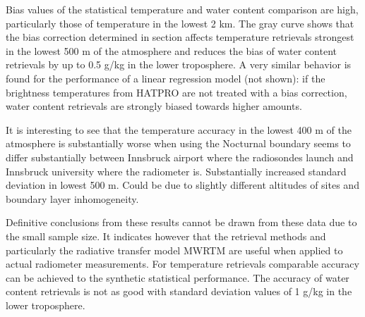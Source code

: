         {}

    Bias values of the statistical temperature and water content comparison
    are high, particularly those of temperature in the lowest 2 km. The gray
    curve shows that the bias correction determined in section \in[ch:hatpro]
    affects temperature retrievals strongest in the lowest 500 m of the
    atmosphere and reduces the bias of water content retrievals by up to 0.5
    g/kg in the lower troposphere. A very similar behavior is found for the
    performance of a linear regression model (not shown): if the brightness
    temperatures from HATPRO are not treated with a bias correction, water
    content retrievals are strongly biased towards higher amounts.

    It is interesting to see that the temperature accuracy in the lowest 400 m
    of the atmosphere is substantially worse when using the 
    Nocturnal boundary seems to differ substantially between Innsbruck airport
    where the radiosondes launch and Innsbruck university where the radiometer
    is. Substantially increased standard deviation in lowest 500 m. Could be
    due to slightly different altitudes of sites and boundary layer
    inhomogeneity.

    Definitive conclusions from these results cannot be drawn from these data
    due to the small sample size. It indicates however that the retrieval
    methods and particularly the radiative transfer model MWRTM are useful
    when applied to actual radiometer measurements. For temperature retrievals
    comparable accuracy can be achieved to the synthetic statistical
    performance. The accuracy of water content retrievals is not as good with
    standard deviation values of 1 g/kg in the lower troposphere.

